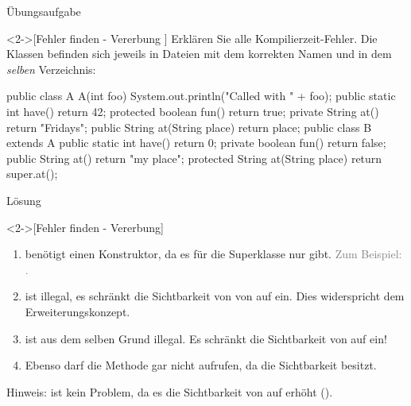 \ifull
\begin{frame}[c,fragile]{Übungsaufgabe}
    \begin{exercise}<2->[Fehler finden - Vererbung ]
        \pause{}Erklären Sie alle Kompilierzeit-Fehler. Die Klassen befinden sich jeweils in Dateien mit dem korrekten Namen und in dem \emph{selben} Verzeichnis:\pause{}
%
\begin{plainjava}
public class A {
    A(int foo) { System.out.println("Called with " + foo); }
    public static int have() { return 42; }
    protected boolean fun() { return true; }
    private String at() { return "Fridays"; }
    public String at(String place) { return place; }
}
public class B extends A {
    public static int have() { return 0; }
    private boolean fun() { return false; }
    public String at() { return "my place"; }
    protected String at(String place) { return super.at(); }
}
\end{plainjava}
    \end{exercise}
\end{frame}

\begin{frame}[c,fragile]{Lösung}
    \begin{solve}<2->[Fehler finden - Vererbung]
        \begin{enumerate}[<+(1)->]
            \item {} benötigt einen Konstruktor, da es für die Superklasse nur  gibt.\pause{} \textcolor{gray}{Zum Beispiel: .}
            \item {} ist illegal, es schränkt die Sichtbarkeit von  von  auf  ein. Dies widerspricht dem Erweiterungskonzept.
            \item {} ist aus dem selben Grund illegal. Es schränkt die Sichtbarkeit von  auf  ein!
            \item Ebenso darf  die Methode  gar nicht aufrufen, da  die Sichtbarkeit  besitzt.
        \end{enumerate}
        Hinweis:  ist kein Problem, da es die Sichtbarkeit von  auf  erhöht ().
    \end{solve}
\end{frame}
\fi


